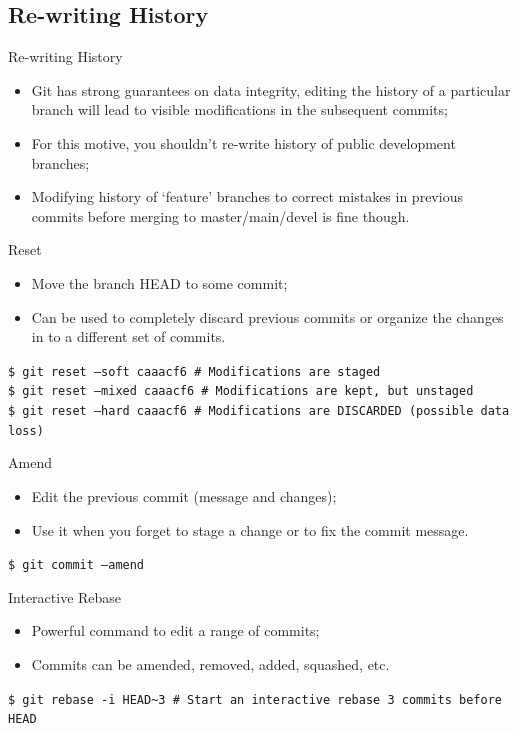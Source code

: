 \documentclass{beamer}
\begin{document}
\subsection{Re-writing History}
\begin{frame}{Re-writing History}
  \begin{itemize}
    \item Git has strong guarantees on data integrity, editing the history of a particular branch will lead to visible modifications in the subsequent commits;
    \item For this motive, you shouldn't re-write history of public development branches;
    \item Modifying history of `feature' branches to correct mistakes in previous commits before merging to master/main/devel is fine though.
  \end{itemize}
\end{frame}

\begin{frame}{Reset}
  \begin{itemize}
    \item Move the branch HEAD to some commit;
    \item Can be used to completely discard previous commits or organize the changes in to a different set of commits.
  \end{itemize}
  \begin{block}{}
    \texttt{\$ git reset --soft caaacf6 \# Modifications are staged} \\
    \texttt{\$ git reset --mixed caaacf6 \# Modifications are kept, but unstaged} \\
    \texttt{\$ git reset --hard caaacf6 \# Modifications are DISCARDED (possible data loss)}
  \end{block}
\end{frame}

\begin{frame}{Amend}
  \begin{itemize}
    \item Edit the previous commit (message and changes);
    \item Use it when you forget to stage a change or to fix the commit message.
  \end{itemize}
  \begin{block}{}
    \texttt{\$ git commit --amend}
  \end{block}
\end{frame}

\begin{frame}{Interactive Rebase}
  \begin{itemize}
    \item Powerful command to edit a range of commits;
    \item Commits can be amended, removed, added, squashed, etc.
  \end{itemize}
  \begin{block}{}
    \texttt{\$ git rebase -i HEAD\textasciitilde{}3 \# Start an interactive rebase 3 commits before HEAD}
  \end{block}
\end{frame}
\end{document}
